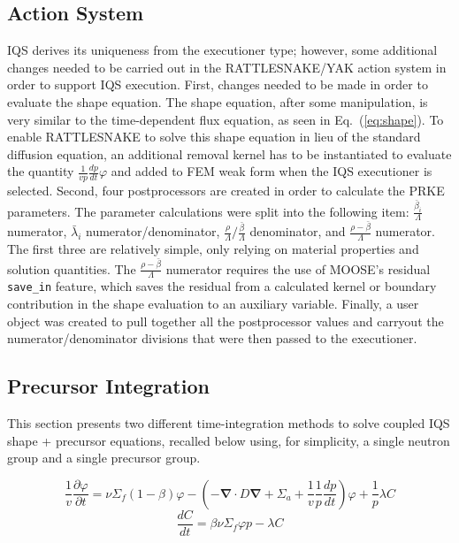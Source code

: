 \documentclass[12pt]{article}
\newcommand{\bs}[1]{\mathbf{#1}}
\renewcommand{\div}{\bs{\nabla}\! \cdot \!}
\newcommand{\grad}{\bs{\nabla}}
\newcommand{\eqt}[1]{Eq.~(\ref{#1})}                     %
\newcommand{\be}{\begin{equation}}
\newcommand{\ee}{\end{equation}}
\begin{document}
\subsection{Action System}

IQS derives its uniqueness from the executioner type; however, some additional changes needed to be carried out in the RATTLESNAKE/YAK action system in order to support IQS execution.   First, changes needed to be made in order to evaluate the shape equation.  The shape equation, after some manipulation, is very similar to the time-dependent flux equation, as seen in \eqt{eq:shape}.  To enable RATTLESNAKE to solve this shape equation in lieu of the standard diffusion equation, an additional removal kernel has to be instantiated to evaluate the quantity $\frac{1}{vp}\frac{dp}{dt}\varphi$ and added to FEM weak form  when the IQS executioner is selected.  Second, four postprocessors are created in order to calculate the PRKE parameters.  The parameter calculations were split into the following item: $\frac{\bar{\beta}_i}{\Lambda}$ numerator, $\bar{\lambda}_i$ numerator/denominator, $\frac{\rho}{\Lambda}/\frac{\bar{\beta}}{\Lambda}$ denominator, and $\frac{\rho-\bar{\beta}}{\Lambda}$ numerator.  The first three are relatively simple, only relying on material properties and solution quantities.  The $\frac{\rho-\bar{\beta}}{\Lambda}$ numerator requires the use of MOOSE's residual {\tt save\_in} feature, which saves the residual from a calculated kernel or boundary contribution in the shape evaluation to an auxiliary variable.  Finally, a user object was created to pull together all the postprocessor values and carryout the numerator/denominator divisions that were then passed to the executioner.

\subsection{Precursor Integration}
This section presents two different time-integration methods to solve coupled IQS shape + precursor equations, recalled below
using, for simplicity, a single neutron group and a single precursor group.

\be
\frac{1}{v}\frac{\partial\varphi}{\partial t}=\nu\Sigma_f(1-\beta)\varphi-\left(-\div D \grad + \Sigma_a + \frac{1}{v}\frac{1}{p}\frac{dp}{dt}\right)\varphi+\frac{1}{p}\lambda C 
\ee
\be
\frac{dC}{dt} = \beta\nu \Sigma_f \varphi p - \lambda C
\ee
\end{document}
